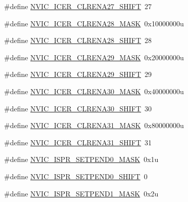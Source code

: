 \begin{DoxyCompactItemize}
\item 
\#define \hyperlink{group___n_v_i_c___register___masks_gae129ab240184fd187397a4d5f91aac6e}{N\+V\+I\+C\+\_\+\+I\+C\+E\+R\+\_\+\+C\+L\+R\+E\+N\+A27\+\_\+\+S\+H\+I\+FT}~27
\item 
\#define \hyperlink{group___n_v_i_c___register___masks_gae441a57bb6a91d1ec804e2a4ab28822d}{N\+V\+I\+C\+\_\+\+I\+C\+E\+R\+\_\+\+C\+L\+R\+E\+N\+A28\+\_\+\+M\+A\+SK}~0x10000000u
\item 
\#define \hyperlink{group___n_v_i_c___register___masks_ga21f3ee0cd46d40bb371984596b48a435}{N\+V\+I\+C\+\_\+\+I\+C\+E\+R\+\_\+\+C\+L\+R\+E\+N\+A28\+\_\+\+S\+H\+I\+FT}~28
\item 
\#define \hyperlink{group___n_v_i_c___register___masks_ga60295fcb165685670d0e5d54a4499a1e}{N\+V\+I\+C\+\_\+\+I\+C\+E\+R\+\_\+\+C\+L\+R\+E\+N\+A29\+\_\+\+M\+A\+SK}~0x20000000u
\item 
\#define \hyperlink{group___n_v_i_c___register___masks_ga1e7f618229c33dc5ed6a23903f98fbba}{N\+V\+I\+C\+\_\+\+I\+C\+E\+R\+\_\+\+C\+L\+R\+E\+N\+A29\+\_\+\+S\+H\+I\+FT}~29
\item 
\#define \hyperlink{group___n_v_i_c___register___masks_ga6ff4fef5029adcc745122ded3c95eff8}{N\+V\+I\+C\+\_\+\+I\+C\+E\+R\+\_\+\+C\+L\+R\+E\+N\+A30\+\_\+\+M\+A\+SK}~0x40000000u
\item 
\#define \hyperlink{group___n_v_i_c___register___masks_gabf7b6b13759d416fdff715d6bb7aeac7}{N\+V\+I\+C\+\_\+\+I\+C\+E\+R\+\_\+\+C\+L\+R\+E\+N\+A30\+\_\+\+S\+H\+I\+FT}~30
\item 
\#define \hyperlink{group___n_v_i_c___register___masks_ga0907bd00967fca851b2736f05b54df63}{N\+V\+I\+C\+\_\+\+I\+C\+E\+R\+\_\+\+C\+L\+R\+E\+N\+A31\+\_\+\+M\+A\+SK}~0x80000000u
\item 
\#define \hyperlink{group___n_v_i_c___register___masks_gaede68be735405ed86a3a262c702b8e59}{N\+V\+I\+C\+\_\+\+I\+C\+E\+R\+\_\+\+C\+L\+R\+E\+N\+A31\+\_\+\+S\+H\+I\+FT}~31
\item 
\#define \hyperlink{group___n_v_i_c___register___masks_ga7a98580a454c3027a1ecfd7bf2ff3655}{N\+V\+I\+C\+\_\+\+I\+S\+P\+R\+\_\+\+S\+E\+T\+P\+E\+N\+D0\+\_\+\+M\+A\+SK}~0x1u
\item 
\#define \hyperlink{group___n_v_i_c___register___masks_gaa757bd63f310c2451471ec3dcd886a8a}{N\+V\+I\+C\+\_\+\+I\+S\+P\+R\+\_\+\+S\+E\+T\+P\+E\+N\+D0\+\_\+\+S\+H\+I\+FT}~0
\item 
\#define \hyperlink{group___n_v_i_c___register___masks_ga5808e6053ab3ece6f30901d616019c71}{N\+V\+I\+C\+\_\+\+I\+S\+P\+R\+\_\+\+S\+E\+T\+P\+E\+N\+D1\+\_\+\+M\+A\+SK}~0x2u

\end{DoxyCompactItemize}
